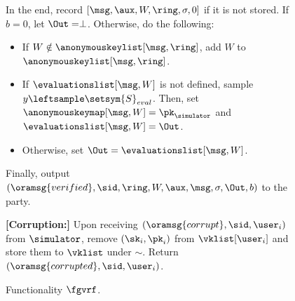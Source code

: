 \begin{figure}
\begin{tcolorbox}[left=2pt,right=2pt]
{\begin{list}{\hspace*{1pt} C}{\setlength\leftmargin{0.15in}}
				\end{list}
				In the end,  record $ [\msg,\aux,W,\ring,\sigma, 0] $ if it is not stored. If $ b = 0 $, let $\Out= \perp $. Otherwise,   do the following:
				\begin{itemize}
					\item If $ W \notin \anonymouskeylist[\msg,\ring] $, add $ W $ to $ \anonymouskeylist[\msg,\ring]  $.
					\item If $ \evaluationslist[\msg,W] $ is not defined, sample $ y \leftsample \setsym{S}_{eval}$. Then, set $ \anonymouskeymap[\msg,W]  = \pk_\simulator$ and $ \evaluationslist[\msg, W] = \Out$.
					\item Otherwise, set $ \Out = \evaluationslist[\msg, W]$. 	
				\end{itemize}
				Finally, output $(\oramsg{verified}, \sid, \ring,W, \aux,\msg, \sigma, \Out, b)$ to the party.
				
				
				\textbf{[Corruption:]} 
				Upon receiving $ (\oramsg{corrupt}, \sid, \user_i) $ from $ \simulator $, remove $ (\sk_i,\pk_i) $ from $ \vklist[\user_i] $ and store them to $ \vklist $ under $ \sim $. Return $ (\oramsg{corrupted}, \sid,\user_i) $.
			}
		\end{tcolorbox}
		\caption{Functionality $\fgvrf$.\label{f:gvrf}}
	\end{figure}
	
	

